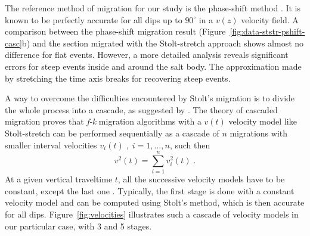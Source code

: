 \par
The reference method of migration for our study is the phase-shift
method \cite[]{GEO43-07-13421351}. It is known to be perfectly accurate
for all dips up to $90^\circ$ in a $v(z)$ velocity field. A comparison
between the phase-shift migration result
(Figure~\ref{fig:data-ststr-pshift-casc}b) and the section migrated
with the Stolt-stretch approach shows almost no difference for flat
events. However, a more detailed analysis reveals significant errors
for steep events inside and around the salt body. The approximation
made by stretching the time axis breaks for recovering steep events.
\par
A way to overcome the difficulties encountered by Stolt's migration is
to divide the whole process into a cascade, as suggested by
\cite{GEO53-07-08810893}. The theory of cascaded migration proves
that {\it f-k} migration algorithms with a $v(t)$ velocity model like
Stolt-stretch can be performed sequentially as a cascade of $n$
migrations with smaller interval velocities $v_i(t) \; , \;
i=1,\ldots,n$, such then
\begin{equation}
\label{eqn:larner}
v^2(t) = \sum_{i=1}^{n} v_i^2(t)\;.
\end{equation}
At a given vertical traveltime $t$, all the successive velocity models
have to be constant, except the last one \cite[]{GEO52-05-06180643}.
Typically, the first stage is done with a constant velocity model and
can be computed using Stolt's method, which is then accurate for all
dips. Figure~\ref{fig:velocities} illustrates such a cascade of
velocity models in our particular case, with 3 and 5 stages.

